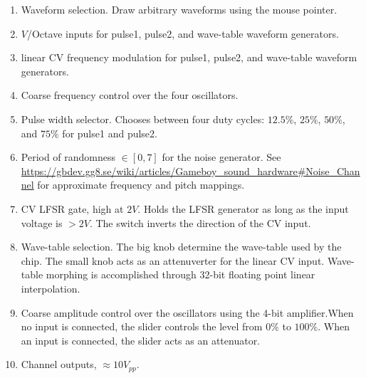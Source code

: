 \documentclass[12pt,letter]{article}
\begin{document}
\begin{enumerate}
  \item Waveform selection. Draw arbitrary waveforms using the mouse pointer.
  \item $V$/Octave inputs for pulse1, pulse2, and wave-table waveform generators.
  \item linear CV frequency modulation for pulse1, pulse2, and wave-table waveform generators.
  \item Coarse frequency control over the four oscillators.
  \item Pulse width selector. Chooses between four duty cycles: $12.5\%$, $25\%$, $50\%$, and $75\%$ for pulse1 and pulse2.
  \item Period of randomness $\in [0, 7]$ for the noise generator. See \url{https://gbdev.gg8.se/wiki/articles/Gameboy_sound_hardware#Noise_Channel} for approximate frequency and pitch mappings.
  \item CV LFSR gate, high at $2V$. Holds the LFSR generator as long as the input voltage is $>2V$. The switch inverts the direction of the CV input.
  \item Wave-table selection. The big knob determine the wave-table used by the chip. The small knob acts as an attenuverter for the linear CV input. Wave-table morphing is accomplished through 32-bit floating point linear interpolation.
  \item Coarse amplitude control over the oscillators using the 4-bit amplifier.When no input is connected, the slider controls the level from $0\%$ to $100\%$. When an input is connected, the slider acts as an attenuator.
  \item Channel outputs, ${\approx}10V_{pp}$.
\end{enumerate}


\clearpage
\renewcommand\refname{References \& Acknowledgments}
\nocite{*}


\end{document}
